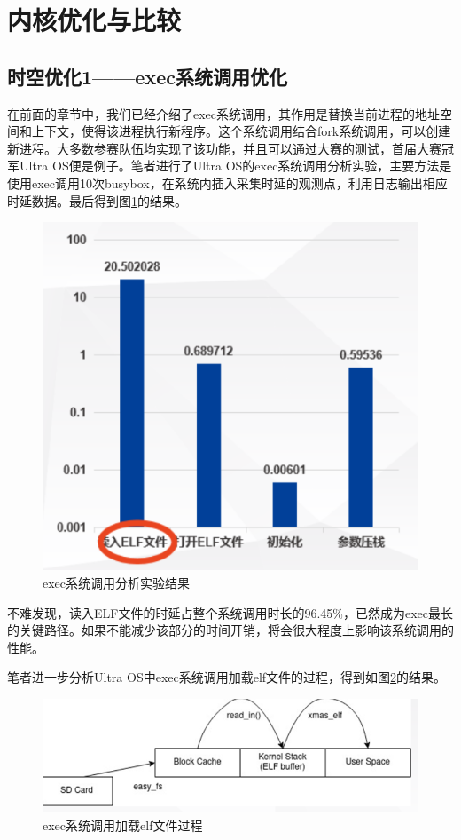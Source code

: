 \section{内核优化与比较}
\subsection{时空优化1——exec系统调用优化}

在前面的章节中，我们已经介绍了exec系统调用，其作用是替换当前进程的地址空间和上下文，使得该进程执行新程序。这个系统调用结合fork系统调用，可以创建新进程。大多数参赛队伍均实现了该功能，并且可以通过大赛的测试，首届大赛冠军Ultra OS便是例子。笔者进行了Ultra OS的exec系统调用分析实验，主要方法是使用exec调用10次busybox，在系统内插入采集时延的观测点，利用日志输出相应时延数据。最后得到图\ref{exam-1}的结果。

\begin{figure}[htbp]
	\centering
	\includegraphics[scale=0.75]{figures/10-04/10-04-01.png}
	\caption{exec系统调用分析实验结果}
	\label{exam-1}
\end{figure} 

不难发现，读入ELF文件的时延占整个系统调用时长的96.45\%，已然成为exec最长的关键路径。如果不能减少该部分的时间开销，将会很大程度上影响该系统调用的性能。

笔者进一步分析Ultra OS中exec系统调用加载elf文件的过程，得到如图\ref{exam-2}的结果。

\begin{figure}[htbp]
	\centering
	\includegraphics[scale=0.75]{figures/10-04/10-04-02.png}
	\caption{exec系统调用加载elf文件过程}
	\label{exam-2}
\end{figure}

